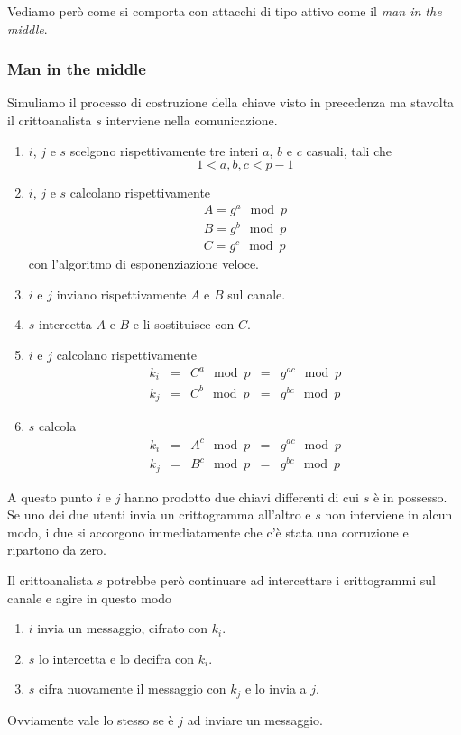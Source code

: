 Vediamo per\`o come si comporta con attacchi di tipo attivo come il \emph{man in the middle}.

\subsubsection{Man in the middle}
Simuliamo il processo di costruzione della chiave visto in precedenza ma stavolta il crittoanalista $s$ interviene
nella comunicazione.
\begin{enumerate}
	\item $i$, $j$ e $s$ scelgono rispettivamente tre interi $a$, $b$ e $c$ casuali, tali che
	      \[ 1 < a, b, c < p-1 \]
	\item $i$, $j$ e $s$ calcolano rispettivamente
	      \[
		      \begin{matrix}
			      A = g^a \mod{p} \\
			      B = g^b \mod{p} \\
			      C = g^c \mod{p}
		      \end{matrix}
	      \]
	      con l'algoritmo di esponenziazione veloce.
	\item $i$ e $j$ inviano rispettivamente $A$ e $B$ sul canale.
	\item $s$ intercetta $A$ e $B$ e li sostituisce con $C$.
	\item $i$ e $j$ calcolano rispettivamente
	      \[
		      \begin{matrix}
			      k_i & = & C^a \mod{p} & = & g^{ac} \mod{p} \\
			      k_j & = & C^b \mod{p} & = & g^{bc} \mod{p}
		      \end{matrix}
	      \]
	\item $s$ calcola
	      \[
		      \begin{matrix}
			      k_i & = & A^c \mod{p} & = & g^{ac} \mod{p} \\
			      k_j & = & B^c \mod{p} & = & g^{bc} \mod{p}
		      \end{matrix}
	      \]
\end{enumerate}
A questo punto $i$ e $j$ hanno prodotto due chiavi differenti di cui $s$ \`e in possesso. Se uno dei due utenti
invia un crittogramma all'altro e $s$ non interviene in alcun modo, i due si accorgono immediatamente che c'\`e
stata una corruzione e ripartono da zero.

Il crittoanalista $s$ potrebbe per\`o continuare ad intercettare i crittogrammi sul canale e agire in questo modo
\begin{enumerate}
	\item $i$ invia un messaggio, cifrato con $k_i$.
	\item $s$ lo intercetta e lo decifra con $k_i$.
	\item $s$ cifra nuovamente il messaggio con $k_j$ e lo invia a $j$.
\end{enumerate}
Ovviamente vale lo stesso se \`e $j$ ad inviare un messaggio.

